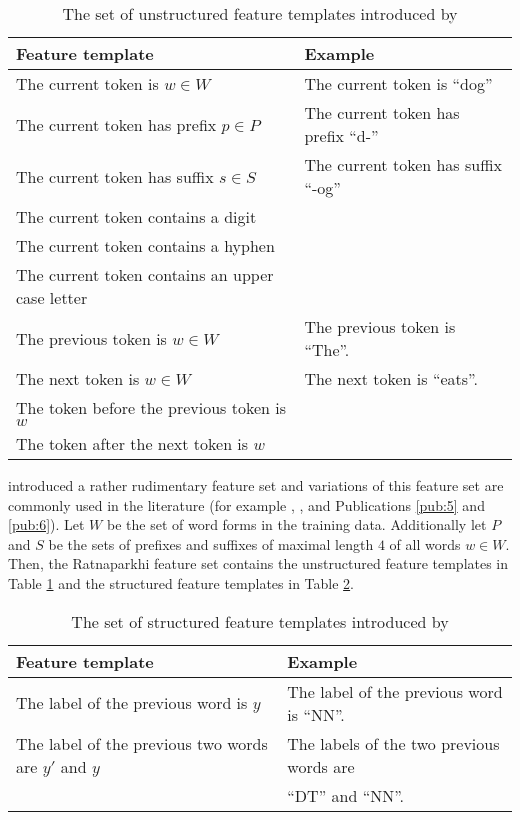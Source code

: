 \begin{table}[!htb]
\begin{tabularx}{\textwidth}{l|l}  
\hline
Feature template & Example\\
\hline
\parbox{0.5\textwidth}{The current token is $w \in W$} & \parbox{0.5\textwidth}{The current token is ``dog''}\\
The current token has prefix $p\in P$ & The current token has prefix ``d-''\\
The current token has suffix $s\in S$ & The current token has suffix ``-og''\\
The current token contains a digit & \\
The current token contains a hyphen & \\
The current token contains an upper case letter & \\
The previous token is $w \in W$ & The previous token is ``The''. \\
The next token is $w\in W$ & The next token is ``eats''. \\
The token before the previous token is $w$ & \\
The token after the next token is $w$ & \\
\end{tabularx}
\caption{The set of unstructured feature templates introduced by \cite{Ratnaparkhi1996}}\label{tab:uratna}
\end{table}

\cite{Ratnaparkhi1996} introduced a rather rudimentary feature set and
variations of this feature set are commonly used in the literature
(for example \cite{Collins2002}, \cite{Lafferty2001}, and Publications \ref{pub:5} and \ref{pub:6}). Let $W$ be
the set of word forms in the training data. Additionally let $P$ and
$S$ be the sets of prefixes and suffixes of maximal length $4$ of all
words $w \in W$. Then, the Ratnaparkhi feature set contains the
unstructured feature templates in Table \ref{tab:uratna} and the
structured feature templates in Table \ref{tab:sratna}.

\begin{table}[!htb]
\begin{tabularx}{\textwidth}{l|l}
\hline
Feature template & Example\\
\hline
\parbox{0.5\textwidth}{The label of the previous word is $y$} & \parbox{0.5\textwidth}{The label of the previous word is ``NN''.} \\
The label of the previous two words are $y'$ and $y$ & The labels of the two previous words are\\
 & ``DT'' and ``NN''. 
\end{tabularx}
\caption{The set of structured feature templates introduced by \cite{Ratnaparkhi1996}}\label{tab:sratna}
\end{table}

